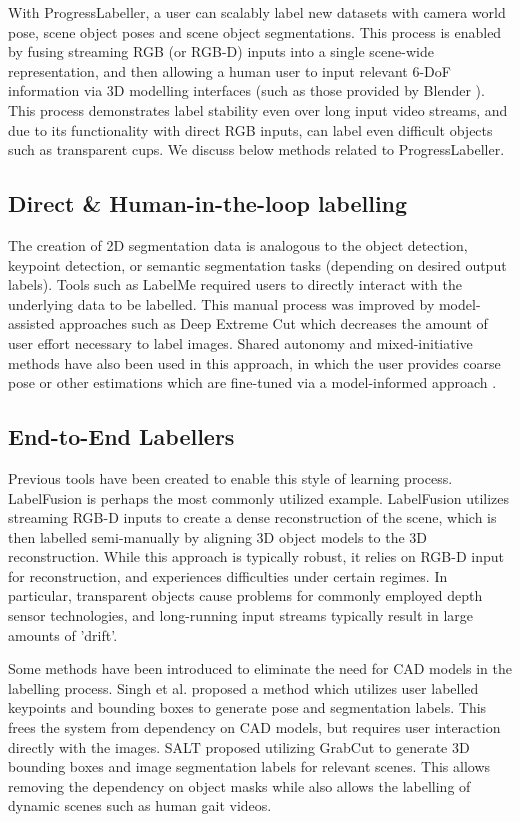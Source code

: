 With ProgressLabeller, a user can scalably label new datasets with camera world pose, scene object poses and scene object segmentations. This process is enabled by fusing streaming RGB (or RGB-D) inputs into a single scene-wide representation, and then allowing a human user to input relevant 6-DoF information via 3D modelling interfaces (such as those provided by Blender \cite{blender}). This process demonstrates label stability even over long input video streams, and due to its functionality with direct RGB inputs, can label even difficult objects such as transparent cups.  We discuss below methods related to ProgressLabeller.

\subsection{Direct \& Human-in-the-loop labelling}
The creation of 2D segmentation data is analogous to the object detection, keypoint detection, or semantic segmentation tasks (depending on desired output labels). Tools such as LabelMe \cite{russell2008labelme} required users to directly interact with the underlying data to be labelled. This manual process was improved by model-assisted approaches such as Deep Extreme Cut \cite{maninis2018deep} which decreases the amount of user effort necessary to label images.
Shared autonomy and mixed-initiative methods have also been used in this approach, in which the user provides coarse pose or other estimations which are fine-tuned via a model-informed approach \cite{ye2021human}.

 
\subsection{End-to-End Labellers}
Previous tools have been created to enable this style of learning process. LabelFusion \cite{marion2018label} is perhaps the most commonly utilized example. LabelFusion utilizes streaming RGB-D inputs to create a dense reconstruction of the scene, which is then labelled semi-manually by aligning 3D object models to the 3D reconstruction. While this approach is typically robust, it relies on RGB-D input for reconstruction, and experiences difficulties under certain regimes. In particular, transparent objects cause problems for commonly employed depth sensor technologies, and long-running input streams typically result in large amounts of 'drift'. 

Some methods have been introduced to eliminate the need for CAD models in the labelling process. Singh et al. \cite{singh2021rapid} proposed a method which utilizes user labelled keypoints and bounding boxes to generate pose and segmentation labels. This frees the system from dependency on CAD models, but requires user interaction directly with the images. SALT \cite{stumpf2021salt} proposed utilizing GrabCut to generate 3D bounding boxes and image segmentation labels for relevant scenes. This allows removing the dependency on object masks while also allows the labelling of dynamic scenes such as human gait videos. 

